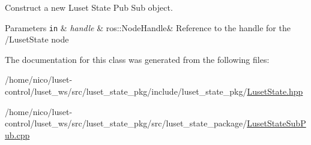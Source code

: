 Construct a new Luset State Pub Sub object. 


\begin{DoxyParams}[1]{Parameters}
\mbox{\tt in}  & {\em handle} & ros\+::\+Node\+Handle\& Reference to the handle for the /\+Luset\+State node \\
\hline
\end{DoxyParams}


The documentation for this class was generated from the following files\+:\begin{DoxyCompactItemize}
\item 
/home/nico/luset-\/control/luset\+\_\+ws/src/luset\+\_\+state\+\_\+pkg/include/luset\+\_\+state\+\_\+pkg/\hyperlink{LusetState_8hpp}{Luset\+State.\+hpp}\item 
/home/nico/luset-\/control/luset\+\_\+ws/src/luset\+\_\+state\+\_\+pkg/src/luset\+\_\+state\+\_\+package/\hyperlink{LusetStateSubPub_8cpp}{Luset\+State\+Sub\+Pub.\+cpp}\end{DoxyCompactItemize}
